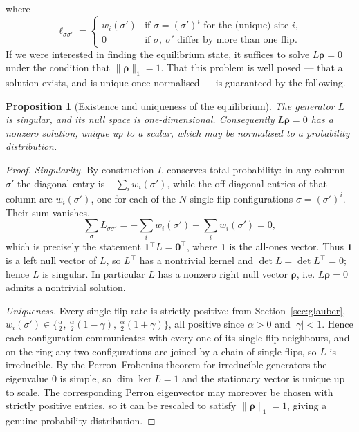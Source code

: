 \documentclass[12pt]{article}
\newcommand{\brho}{\boldsymbol{\rho}}
\newtheorem{proposition}[theorem]{Proposition}
\theoremstyle{definition}
\theoremstyle{remark}
\begin{document}
where 
\[
\ell_{\sigma \sigma'} =
\begin{cases}
w_i(\sigma') & \text{if } \sigma = (\sigma')^i \text{ for the (unique) site } i, \\[4pt]
0 & \text{if } \sigma,\ \sigma' \text{ differ by more than one flip.}
\end{cases}
\]
If we were interested in finding the equilibrium state, it suffices to solve $L \brho = 0$ under the condition that $\|\brho\|_1  = 1$. That this problem is well posed --- that a solution exists, and is unique once normalised --- is guaranteed by the following.

\begin{proposition}[Existence and uniqueness of the equilibrium]\label{prop:singular}
The generator $L$ is singular, and its null space is one-dimensional. Consequently $L\brho = 0$ has a nonzero solution, unique up to a scalar, which may be normalised to a probability distribution.
\end{proposition}

\begin{proof}
\emph{Singularity.} By construction $L$ conserves total probability: in any column $\sigma'$ the diagonal entry is $-\sum_i w_i(\sigma')$, while the off-diagonal entries of that column are $w_i(\sigma')$, one for each of the $N$ single-flip configurations $\sigma = (\sigma')^i$. Their sum vanishes,
\[
\sum_{\sigma} L_{\sigma\sigma'}
= -\sum_i w_i(\sigma') + \sum_i w_i(\sigma') = 0,
\]
which is precisely the statement $\mathbf{1}^\top L = \mathbf{0}^\top$, where $\mathbf{1}$ is the all-ones vector. Thus $\mathbf{1}$ is a left null vector of $L$, so $L^\top$ has a nontrivial kernel and $\det L = \det L^\top = 0$; hence $L$ is singular. In particular $L$ has a nonzero right null vector $\brho$, i.e. $L\brho = 0$ admits a nontrivial solution.

\emph{Uniqueness.} Every single-flip rate is strictly positive: from Section~\ref{sec:glauber}, $w_i(\sigma') \in \{\tfrac{\alpha}{2},\, \tfrac{\alpha}{2}(1-\gamma),\, \tfrac{\alpha}{2}(1+\gamma)\}$, all positive since $\alpha > 0$ and $|\gamma| < 1$. Hence each configuration communicates with every one of its single-flip neighbours, and on the ring any two configurations are joined by a chain of single flips, so $L$ is irreducible. By the Perron--Frobenius theorem for irreducible generators the eigenvalue $0$ is simple, so $\dim\ker L = 1$ and the stationary vector is unique up to scale. The corresponding Perron eigenvector may moreover be chosen with strictly positive entries, so it can be rescaled to satisfy $\|\brho\|_1 = 1$, giving a genuine probability distribution.
\end{proof}
\end{document}
